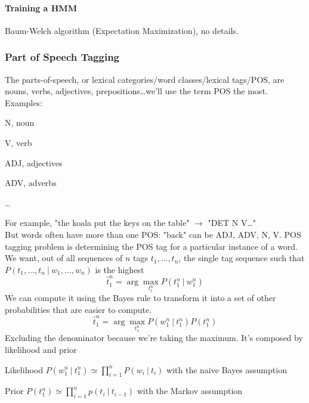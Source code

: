 \documentclass[10pt]{report}
\begin{document}
\paragraph{Training a HMM} Baum-Welch algorithm (Expectation Maximization), no details.
\subsubsection{Part of Speech Tagging} The parts-of-speech, or lexical categories/word classes/lexical tags/POS, are nouns, verbs, adjectives, prepositions\ldots we'll use the term POS the most. Examples:
\begin{list}{}{}
	\item N, noun
	\item V, verb
	\item ADJ, adjectives
	\item ADV, adverbs
	\item \ldots
\end{list}
For example, "the koala put the keys on the table" $\rightarrow$ "DET N V\ldots"\\
But words often have more than one POS: "back" can be ADJ, ADV, N, V. POS tagging problem is determining the POS tag for a particular instance of a word.\\
We want, out of all sequences of $n$ tags $t_1,\ldots,t_n$, the single tag sequence such that $P(t_1,\ldots,t_n\:|\:w_1,\ldots,w_n)$ is the highest $$\hat{t}_1^n=\arg\max_{t_1^n} P(t_1^n\:|\: w_1^n)$$
We can compute it using the Bayes rule to transform it into a set of other probabilities that are easier to compute.
$$\hat{t}_1^n=\arg\max_{t_1^n} P(w_1^n \:|\: t_1^n)P(t_1^n)$$
Excluding the denominator because we're taking the maximum. It's composed by likelihood and prior\begin{list}{}{}
	\item Likelihood $P(w_1^n \:|\: t_1^n) \simeq \prod_{i=1}^n P(w_i\:|\:t_i)$ with the naive Bayes assumption
	\item Prior $P(t_1^n)\simeq \prod_{i=1}^n p(t_i\:|\:t_{i-1})$ with the Markov assumption 
\end{list}
\end{document}
